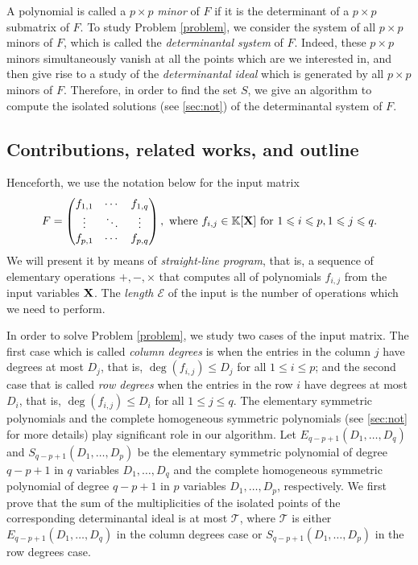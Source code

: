 \documentclass[11pt]{article}
\numberwithin{Property}{section}
\numberwithin{Theorem}{section}
\numberwithin{Proposition}{section}
\numberwithin{Lemma}{section}
\numberwithin{Corollary}{section}
\numberwithin{Definition}{section}
\numberwithin{Remark}{section}
\numberwithin{Conjecture}{section}
\numberwithin{Problem}{section}
\numberwithin{Claim}{section}
\theoremstyle{definition}
\numberwithin{Example}{section}
\renewcommand{\leq}{\leqslant}
\newcommand{\field}{\mathbb{K}} %
\newcommand{\mat}[1]{\mathbf{\MakeUppercase{#1}}} %
\newcommand{\improve}[1]{\textcolor{blue}{#1}} %
\begin{document}
A polynomial is called a $p \times p$ \emph{minor} of $F$ if it is the determinant of a $p \times p$ submatrix of $F$. To study Problem \ref{problem}, we consider the system of all $p \times p$ minors of $F$, which is called  the \emph{determinantal system} of $F$. Indeed, these $p \times p$ minors simultaneously vanish at all the points which are we interested in, and then give rise to a study of the \emph{determinantal ideal} which is generated by all $p \times p$ minors of $F$. Therefore, in order to find the set $S$, we give an algorithm to compute the isolated solutions (see \improve{\cref{sec:not}}) of the determinantal system of $F$. 
\subsection{Contributions, related works, and outline}
Henceforth, we use the notation below for the input matrix
\[ F = 
\left( \begin{matrix}
f_{1,1} & \cdots & f_{1,q}\\
\vdots & \ddots & \vdots \\
f_{p,1} & \cdots & f_{p,q}
\end{matrix} \right), \ \mathrm{where} \ f_{i,j} \in \field[\mat{X}] \ \mathrm{for} \ 1 \leq i \leq p, 1 \leq j \leq q.
\]
 We will present it by means of \emph{straight-line program}, that is, a sequence of elementary operations $+, -, \times$ that computes all of polynomials $f_{i,j}$ from the input variables $\mat{X}$. The \emph{length $\mathcal{E}$} of the input is the number of operations which we need to perform.

In order to solve Problem \ref{problem}, we study two cases of the input matrix. The first case which is called \emph{column degrees} is when the entries in the column $j$ have degrees at most $D_j$, that is, $\deg(f_{i,j}) \leq D_j$ for all $1 \leq i \leq p$; and the second case that is called \emph{row degrees} when the entries in the row $i$ have degrees at most $D_i$,  that is, $\deg(f_{i,j}) \leq D_i$ for all $1 \leq j \leq q$. The elementary symmetric polynomials and the complete homogeneous symmetric polynomials (see \improve{\cref{sec:not}} for more details) play significant role in our algorithm. Let $E_{q-p+1}(D_1, \ldots, D_q)$ and $S_{q-p+1}(D_1, \ldots, D_p)$ be the elementary symmetric polynomial of degree $q-p+1$ in $q$ variables $D_1, \ldots, D_q$ and the complete homogeneous symmetric polynomial of degree $q-p+1$ in $p$ variables $D_1, \ldots, D_p$, respectively. 
We first prove that the sum of the multiplicities of the isolated points of the corresponding determinantal ideal is at most $\mathcal{T}$, where $\mathcal{T}$ is either $E_{q-p+1}(D_1, \ldots, D_q)$ in the column degrees case or $S_{q-p+1}(D_1, \ldots, D_p)$ in the row degrees case.
\end{document}

